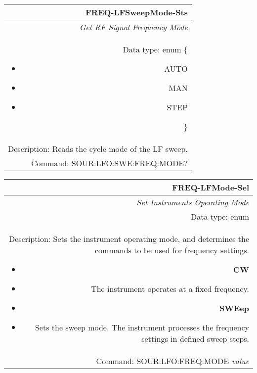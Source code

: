 \documentclass[openany]{article}
\begin{document}
		\begin{tabular}{N}
			\hline
			\bfseries FREQ-LFSweepMode-Sts \\ \hline
			\emph{Get RF Signal Frequency Mode} \\
			Data type: enum \{\begin{itemize}[noitemsep]
				\small
				\item[] AUTO
				\item[] MAN
				\item[] STEP
			\end{itemize}\} \\ 
			Description: Reads the cycle mode of the LF sweep. \\
			Command: SOUR:LFO:SWE:FREQ:MODE? \\

		\end{tabular}
%
		\begin{tabular}{N}
			\hline
			\bfseries FREQ-LFMode-Sel \\ \hline
			\emph{Set Instruments Operating Mode} \\
			Data type: enum \\
			Description: Sets the instrument operating mode, and determines the commands to be used for frequency settings.\begin{itemize}[noitemsep]
				\small
				\item[] \textbf{CW} 
				\item[] The instrument operates at a fixed frequency.
				\item[] \textbf{SWEep}
				\item[] Sets the sweep mode. The instrument processes the frequency settings in defined sweep steps.
			\end{itemize} \\
			Command: SOUR:LFO:FREQ:MODE \emph{value} \\

		\end{tabular}
\end{document}
